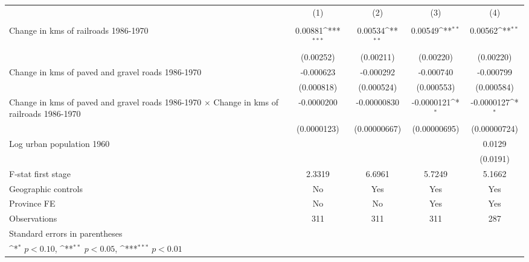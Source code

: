 {
\def\sym#1{\ifmmode^{#1}\else\(^{#1}\)\fi}
\begin{tabular}{l*{4}{c}}
\hline\hline
                &\multicolumn{1}{c}{(1)}&\multicolumn{1}{c}{(2)}&\multicolumn{1}{c}{(3)}&\multicolumn{1}{c}{(4)}\\
                &\multicolumn{1}{c}{}&\multicolumn{1}{c}{}&\multicolumn{1}{c}{}&\multicolumn{1}{c}{}\\
\hline
Change in kms of railroads 1986-1970&  0.00881\sym{***}&  0.00534\sym{**} &  0.00549\sym{**} &  0.00562\sym{**} \\
                &(0.00252)         &(0.00211)         &(0.00220)         &(0.00220)         \\
[1em]
Change in kms of paved and gravel roads 1986-1970&-0.000623         &-0.000292         &-0.000740         &-0.000799         \\
                &(0.000818)         &(0.000524)         &(0.000553)         &(0.000584)         \\
[1em]
Change in kms of paved and gravel roads 1986-1970 $\times$ Change in kms of railroads 1986-1970&-0.0000200         &-0.00000830         &-0.0000121\sym{*}  &-0.0000127\sym{*}  \\
                &(0.0000123)         &(0.00000667)         &(0.00000695)         &(0.00000724)         \\
[1em]
Log urban population 1960&                  &                  &                  &   0.0129         \\
                &                  &                  &                  & (0.0191)         \\
\hline
F-stat first stage&   2.3319         &   6.6961         &   5.7249         &   5.1662         \\
Geographic controls&       No         &      Yes         &      Yes         &      Yes         \\
Province FE     &       No         &       No         &      Yes         &      Yes         \\
Observations    &      311         &      311         &      311         &      287         \\
\hline\hline
\multicolumn{5}{l}{\footnotesize Standard errors in parentheses}\\
\multicolumn{5}{l}{\footnotesize \sym{*} \(p<0.10\), \sym{**} \(p<0.05\), \sym{***} \(p<0.01\)}\\
\end{tabular}
}
